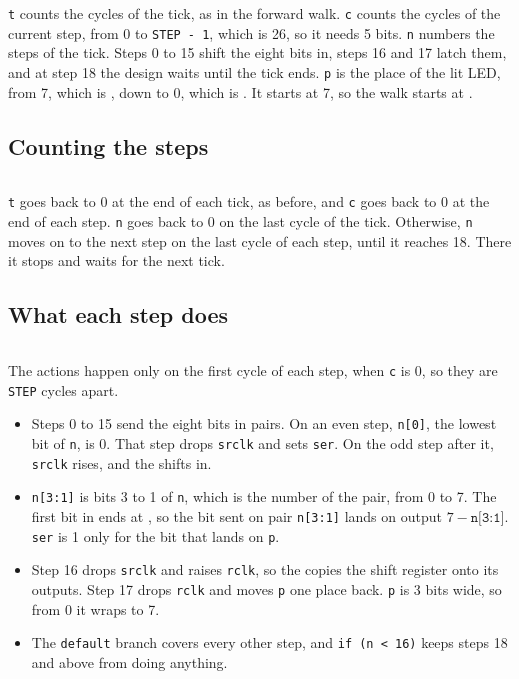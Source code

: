 \documentclass[11pt,a4paper]{article}
\begin{document}
\inputminted[firstline=14, lastline=17]{verilog}{../rtl/walkback/walkback.v}

\texttt{t} counts the cycles of the tick, as in the forward walk. \texttt{c} counts the cycles of the current step, from 0 to \texttt{STEP - 1}, which is 26, so it needs 5 bits. \texttt{n} numbers the steps of the tick. Steps 0 to 15 shift the eight bits in, steps 16 and 17 latch them, and at step 18 the design waits until the tick ends. \texttt{p} is the place of the lit LED, from 7, which is , down to 0, which is . It starts at 7, so the walk starts at .

\subsection*{Counting the steps}

\inputminted[firstline=19, lastline=25]{verilog}{../rtl/walkback/walkback.v}

\texttt{t} goes back to 0 at the end of each tick, as before, and \texttt{c} goes back to 0 at the end of each step. \texttt{n} goes back to 0 on the last cycle of the tick. Otherwise, \texttt{n} moves on to the next step on the last cycle of each step, until it reaches 18. There it stops and waits for the next tick.

\subsection*{What each step does}

\inputminted[firstline=27, lastline=38]{verilog}{../rtl/walkback/walkback.v}

The actions happen only on the first cycle of each step, when \texttt{c} is 0, so they are \texttt{STEP} cycles apart.

\begin{itemize}
  \item Steps 0 to 15 send the eight bits in pairs. On an even step, \texttt{n[0]}, the lowest bit of \texttt{n}, is 0. That step drops \texttt{srclk} and sets \texttt{ser}. On the odd step after it, \texttt{srclk} rises, and the  shifts  in.
  \item \texttt{n[3:1]} is bits 3 to 1 of \texttt{n}, which is the number of the pair, from 0 to 7. The first bit in ends at , so the bit sent on pair \texttt{n[3:1]} lands on output $7 - \texttt{n[3:1]}$. \texttt{ser} is 1 only for the bit that lands on \texttt{p}.
  \item Step 16 drops \texttt{srclk} and raises \texttt{rclk}, so the  copies the shift register onto its outputs. Step 17 drops \texttt{rclk} and moves \texttt{p} one place back. \texttt{p} is 3 bits wide, so from 0 it wraps to 7.
  \item The \texttt{default} branch covers every other step, and \texttt{if (n < 16)} keeps steps 18 and above from doing anything.
\end{itemize}
\end{document}
